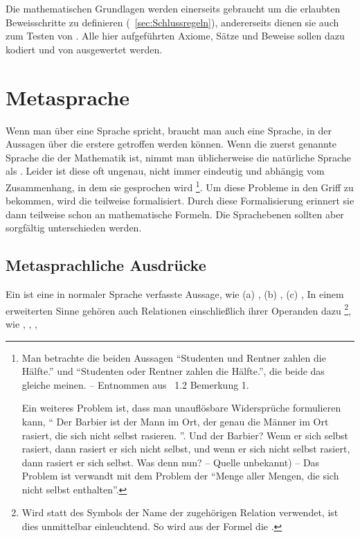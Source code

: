 Die mathematischen Grundlagen werden einerseits gebraucht um die erlaubten Beweisschritte zu definieren (\seename~\vref{sec:Schlussregeln}), andererseits dienen sie auch zum Testen von \ASBA. Alle hier aufgeführten Axiome, Sätze und Beweise sollen dazu kodiert und von \ASBA ausgewertet werden.

\section{Metasprache}%
\label{sec:Metasprache}

Wenn man über eine Sprache spricht, braucht man auch eine Sprache, in der Aussagen über die erstere getroffen werden können.
Wenn die zuerst genannte Sprache die der Mathematik ist, nimmt man üblicherweise die natürliche Sprache als .
Leider ist diese oft ungenau, nicht immer eindeutig und abhängig vom Zusammenhang, in dem sie gesprochen wird%
\footnote{%
	Man betrachte die beiden Aussagen \enquote{Studenten und Rentner zahlen die Hälfte.} und \enquote{Studenten oder Rentner zahlen die Hälfte.}, die beide das gleiche meinen.
	-- Entnommen aus \cite{bib:Rautenberg} \sectionname~1.2 Bemerkung 1.
	
	Ein weiteres Problem ist, dass man unauflösbare Widersprüche formulieren kann, \textzB \enquote{%
		Der Barbier ist der Mann im Ort, der genau die Männer im Ort rasiert, die sich nicht selbst rasieren.%
	}.
	Und der Barbier?
	Wenn er sich selbst rasiert, dann rasiert er sich nicht selbst, und wenn er sich nicht selbst rasiert, dann rasiert er sich selbst.
	Was denn nun?
	-- Quelle unbekannt) --
	Das Problem ist verwandt mit dem Problem der \enquote{Menge aller Mengen, die sich nicht selbst enthalten}.%
}.
Um diese Probleme in den Griff zu bekommen, wird die  teilweise formalisiert.
Durch diese Formalisierung erinnert sie dann teilweise schon an mathematische Formeln.
Die Sprachebenen sollten aber sorgfältig unterschieden werden.

\subsection{Metasprachliche Ausdrücke}%
\label{sub:Metaausdruck}

Ein \emph{} ist eine in normaler Sprache verfasste Aussage, wie \textzB
(a) ,
(b) ,
(c) ,
\textusw
In einem erweiterten Sinne gehören auch Relationen einschließlich ihrer Operanden dazu%
\footnote{%
	Wird statt des Symbols der Name der zugehörigen Relation verwendet, ist dies unmittelbar einleuchtend.
	So wird \textzB aus der Formel  die  .%
},
wie \textzB {}, , , \textusw

